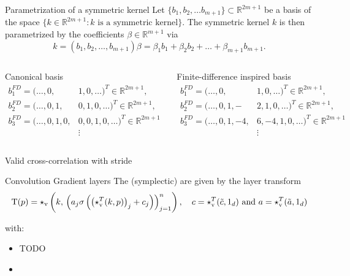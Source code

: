 \begin{frame}{Parametrization of a symmetric kernel}
  Let $\{b_1, b_2, \dots b_{m+1} \} \subset \mathbb{R}^{2m+1}$ be a basis of the space 
  $\{ k \in \mathbb{R}^{2m+1} : k \text{ is a symmetric kernel} \}$.
  The symmetric kernel $k$ is then parametrized by the coefficients $\beta \in \mathbb{R}^{m+1}$ via
  \begin{equation*}
    k = (b_1, b_2, \dots, b_{m+1}) \beta = \beta_1 b_1 + \beta_2 b_2 + \dots + \beta_{m+1} b_{m+1}
    .
  \end{equation*}

  \vspace{0.3cm}
  \begin{columns}
    \centering
    Canonical basis
    \begin{align*}
      b_1^{FD} = (\dots, 0,& 1,0, \dots)^T \in \mathbb{R}^{2m+1},\\
      b_2^{FD} = (\dots, 0, 1,&0,1, 0, \dots)^T \in \mathbb{R}^{2m+1},\\
      b_3^{FD} = (\dots, 0, 1,0,& 0,0,1, 0, \dots)^T \in \mathbb{R}^{2m+1} \\
      &\vdots
    \end{align*}

    \centering
    Finite-difference inspired basis
    \begin{align*}
      b_1^{FD} = (\dots, 0,& 1,0, \dots)^T \in \mathbb{R}^{2m+1},\\
      b_2^{FD} = (\dots, 0, 1,-&2,1, 0, \dots)^T \in \mathbb{R}^{2m+1},\\
      b_3^{FD} = (\dots, 0, 1,-4,& 6,-4,1, 0, \dots)^T \in \mathbb{R}^{2m+1} \\
      &\vdots
    \end{align*}
  \end{columns}
\end{frame}

\begin{frame}{Valid cross-correlation with stride}
  
\end{frame}

\begin{frame}[c]{Convolution Gradient layers}
  The (symplectic)  are given by the layer transform
  \begin{equation*}
    \mathrm{T}(p) = \star_{\text{v}} \left( k, \, 
    \left( a_j \sigma \left( \left( \star_{\text{v}}^T(k,p) \right)_j + c_j \right) \right)_{j=1}^n \right),
		\quad c = \star_{\text{v}}^T(\tilde{c},1_d) 
		\text{ and } a = \star_{\text{v}}^T(\tilde{a},1_d)
  \end{equation*}

  with:
  \begin{itemize}
    \item TODO
    \item {}
  \end{itemize}
\end{frame}

